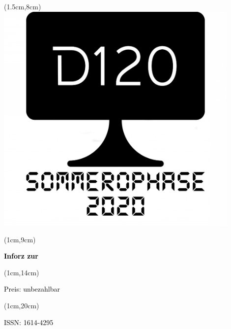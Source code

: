 \begin{titlepage}
    \begin{textblock*}{18cm}(1.5cm,8cm)
        \includegraphics[width=12cm]{../grafik/oinforz_cover_ss20}
    \end{textblock*}

    \begin{textblock*}{5cm}(1cm,9cm)
        \begin{rotate}{90}
            \sffamily\huge\textbf{
                \textcolor{black}{Inforz zur \ophase}}
        \end{rotate}
    \end{textblock*}


    \begin{textblock*}{2cm}(1cm,14cm)
        \begin{rotate}{90}
            \sffamily\small \textcolor{black}{Preis: unbezahlbar}
        \end{rotate}
    \end{textblock*}


    \begin{textblock*}{2cm}(1cm,20cm)
        \begin{rotate}{90}
            \sffamily \textcolor{black}{ISSN: 1614-4295}
        \end{rotate}
    \end{textblock*}

\end{titlepage}
\newpage
